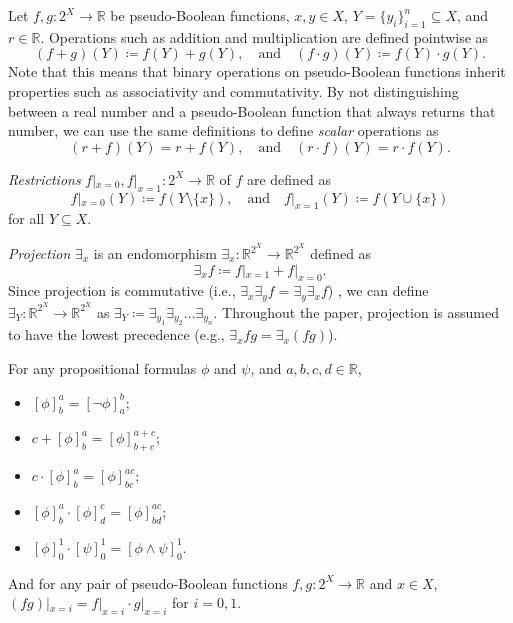 \documentclass[runningheads]{llncs}
\begin{document}
\begin{definition}[Operations] \label{def:operations}
  Let $f, g\colon 2^X \to \mathbb{R}$ be pseudo-Boolean functions, $x, y \in X$,
  $Y = \{y_i\}_{i=1}^n \subseteq X$, and $r \in \mathbb{R}$. Operations such as
  addition and multiplication are defined pointwise as
  \[
    (f+g)(Y) \coloneqq f(Y)+g(Y), \quad \text{and} \quad (f \cdot g)(Y)
    \coloneqq f(Y) \cdot g(Y).
  \]
  Note that this means that binary operations on pseudo-Boolean functions
  inherit properties such as associativity and commutativity. By not
  distinguishing between a real number and a pseudo-Boolean function that always
  returns that number, we can use the same definitions to define \emph{scalar}
  operations as
  \[
    (r+f)(Y) = r+f(Y), \quad \text{and} \quad (r \cdot f)(Y) = r \cdot f(Y).
  \]

  \emph{Restrictions} $f|_{x=0}, f|_{x=1}\colon 2^X \to \mathbb{R}$ of $f$ are
  defined as
  \[
    f|_{x=0}(Y) \coloneqq f(Y \setminus \{x\}), \quad \text{and} \quad
    f|_{x=1}(Y) \coloneqq f(Y \cup \{x\})
  \]
  for all $Y \subseteq X$.

  \emph{Projection} $\exists_x$ is an endomorphism $\exists_x\colon
  \mathbb{R}^{2^X} \to \mathbb{R}^{2^X}$ defined as
  \[
    \exists_xf \coloneqq f|_{x=1} + f|_{x=0}.
  \]
  Since projection is commutative (i.e., $\exists_x\exists_yf =
  \exists_y\exists_xf$) \cite{DBLP:conf/aaai/DudekPV20,DBLP:conf/cp/DudekPV20},
  we can define $\exists_Y\colon \mathbb{R}^{2^X} \to \mathbb{R}^{2^X}$ as
  $\exists_Y \coloneqq \exists_{y_1}\exists_{y_2}\dots\exists_{y_n}$. Throughout
  the paper, projection is assumed to have the lowest precedence (e.g.,
  $\exists_x fg = \exists_x (fg)$).
\end{definition}

\begin{proposition} \label{prop:basic}
  For any propositional formulas $\phi$ and $\psi$, and $a, b, c, d \in
  \mathbb{R}$,
  \begin{itemize}
  \item $[\phi]^a_b = [\neg \phi]^b_a$;
  \item $c + [\phi]^a_b = [\phi]^{a+c}_{b+c}$;
  \item $c \cdot [\phi]^a_b = [\phi]^{ac}_{bc}$;
  \item $[\phi]^a_b \cdot [\phi]^c_d = [\phi]^{ac}_{bd}$;
  \item $[\phi]^1_0 \cdot [\psi]_0^1 = [\phi \land \psi]_0^1$.
  \end{itemize}
  And for any pair of pseudo-Boolean functions $f, g \colon 2^X \to \mathbb{R}$
  and $x \in  X$, $(fg)|_{x=i} = f|_{x=i} \cdot g|_{x=i}$ for $i = 0, 1$.
\end{proposition}
\end{document}
